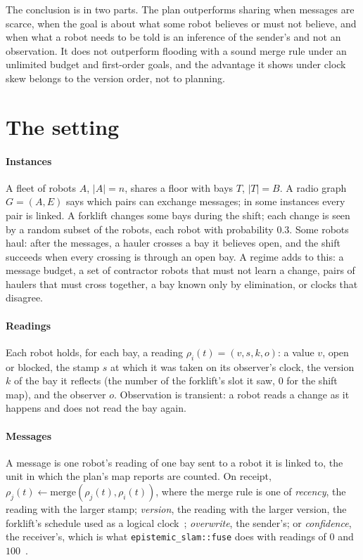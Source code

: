 \documentclass[11pt,a4paper]{article}
\theoremstyle{definition}
\newcommand{\code}[1]{\texttt{\small #1}}
\begin{document}
The conclusion is in two parts. The plan outperforms sharing when messages are
scarce, when the goal is about what some robot believes or must not believe, and
when what a robot needs to be told is an inference of the sender's and not an
observation. It does not outperform flooding with a sound merge rule under an
unlimited budget and first-order goals, and the advantage it shows under clock
skew belongs to the version order, not to planning.

\section{The setting}
\label{sec:setting}

\paragraph{Instances} A fleet of robots $A$, $|A| = n$, shares a floor with bays
$T$, $|T| = B$. A radio graph $G = (A, E)$ says which pairs can exchange messages;
in some instances every pair is linked. A forklift changes some bays during the
shift; each change is seen by a random subset of the robots, each robot with
probability $0.3$. Some robots haul: after the messages, a hauler crosses a bay
it believes open, and the shift succeeds when every crossing is through an open
bay. A regime adds to this: a message budget, a set of contractor robots that
must not learn a change, pairs of haulers that must cross together, a bay known
only by elimination, or clocks that disagree.

\paragraph{Readings} Each robot holds, for each bay, a reading
$\rho_i(t) = (v, s, k, o)$: a value $v$, open or blocked,
the stamp $s$ at which it was taken on its observer's clock, the version $k$ of the
bay it reflects (the number of the forklift's slot it saw, $0$ for the shift
map), and the observer $o$. Observation is transient: a robot reads a change as it
happens and does not read the bay again.

\paragraph{Messages} A message is one robot's reading of one bay sent to a robot
it is linked to, the unit in which the plan's map reports are counted. On receipt,
$\rho_j(t) \leftarrow \mathrm{merge}(\rho_j(t), \rho_i(t))$, where the merge rule
is one of
\emph{recency}, the reading with the larger stamp;
\emph{version}, the reading with the larger version, the forklift's schedule used
as a logical clock~\cite{lamport1978};
\emph{overwrite}, the sender's; or
\emph{confidence}, the receiver's, which is what \code{epistemic\_slam::fuse} does
with readings of $0$ and $100$~\cite{ulises2026sm}.
\end{document}
